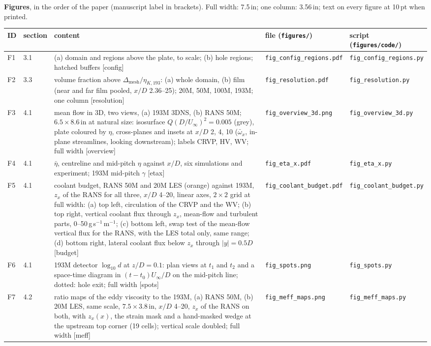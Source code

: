 \documentclass[10pt]{article}
\newcommand{\deta}{\Delta_{\mathrm{mesh}}/\eta_{K,193}}
\newcommand{\etab}{\bar\eta}
\begin{document}
\textbf{Figures}, in the order of the paper (manuscript label in brackets). Full width: 7.5\,in; one column:
3.56\,in; text on every figure at 10\,pt when printed.\par
{\centering\footnotesize
\begin{tabularx}{\textwidth}{@{}l l X l l@{}}
\toprule
ID & section & content & file (\texttt{figures/}) & script (\texttt{figures/code/}) \\
\midrule
F1 & 3.1 & (a) domain and regions above the plate, to scale; (b) hole regions; hatched buffers [config] & \texttt{fig\_config\_regions.pdf} & \texttt{fig\_config\_regions.py} \\
F2 & 3.3 & volume fraction above $\deta$: (a) whole domain, (b) film (near and far film pooled, $x/D$ 2.36--25); 20M, 50M, 100M, 193M; one column [resolution] & \texttt{fig\_resolution.pdf} & \texttt{fig\_resolution.py} \\
F3 & 4.1 & mean flow in 3D, two views, (a) 193M 3DNS, (b) RANS 50M; $6.5\times8.6$\,in at natural size: isosurface $Q(D/U_\infty)^2=0.005$ (grey), plate coloured by $\eta$, cross-planes and insets at $x/D$ 2, 4, 10 ($\bar\omega_x$, in-plane streamlines, looking downstream); labels CRVP, HV, WV; full width [overview] & \texttt{fig\_overview\_3d.png} & \texttt{fig\_overview\_3d.py} \\
F4 & 4.1 & $\etab$, centreline and mid-pitch $\eta$ against $x/D$, six simulations and experiment; 193M mid-pitch $\gamma$ [etax] & \texttt{fig\_eta\_x.pdf} & \texttt{fig\_eta\_x.py} \\
F5 & 4.1 & coolant budget, RANS 50M and 20M LES (orange) against 193M, $z_x$ of the RANS for all three, $x/D$ 4--20, linear axes, $2\times2$ grid at full width: (a) top left, circulation of the CRVP and the WV; (b) top right, vertical coolant flux through $z_x$, mean-flow and turbulent parts, 0--50\,g\,s$^{-1}$\,m$^{-1}$; (c) bottom left, swap test of the mean-flow vertical flux for the RANS, with the LES total only, same range; (d) bottom right, lateral coolant flux below $z_x$ through $|y|=0.5D$ [budget] & \texttt{fig\_coolant\_budget.pdf} & \texttt{fig\_coolant\_budget.py} \\
F6 & 4.1 & 193M detector $\log_{10}d$ at $z/D=0.1$: plan views at $t_1$ and $t_2$ and a space-time diagram in $(t-t_0)U_\infty/D$ on the mid-pitch line; dotted: hole exit; full width [spots] & \texttt{fig\_spots.png} & \texttt{fig\_spots.py} \\
F7 & 4.2 & ratio maps of the eddy viscosity to the 193M, (a) RANS 50M, (b) 20M LES, same scale, $7.5\times3.8$\,in, $x/D$ 4--20, $z_x$ of the RANS on both, with $z_x(x)$, the strain mask and a hand-masked wedge at the upstream top corner (19 cells); vertical scale doubled; full width [meff] & \texttt{fig\_meff\_maps.png} & \texttt{fig\_meff\_maps.py} \\

\end{tabularx}}
\end{document}
